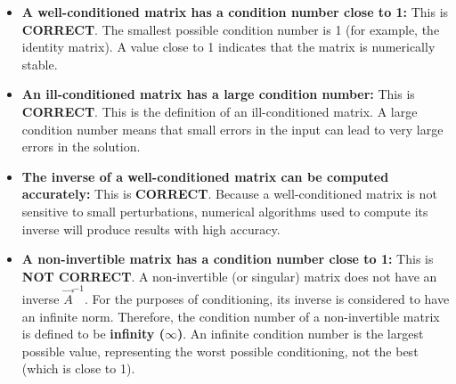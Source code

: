 \documentclass[journal]{IEEEtran}
\begin{document}
\begin{itemize}
    \item[\textbf{1)}] \textbf{A well-conditioned matrix has a condition number close to 1:} This is \textbf{CORRECT}. The smallest possible condition number is 1 (for example, the identity matrix). A value close to 1 indicates that the matrix is numerically stable.\\

    \item[\textbf{2)}] \textbf{An ill-conditioned matrix has a large condition number:} This is \textbf{CORRECT}. This is the definition of an ill-conditioned matrix. A large condition number means that small errors in the input can lead to very large errors in the solution.\\

    \item[\textbf{3)}] \textbf{The inverse of a well-conditioned matrix can be computed accurately:} This is \textbf{CORRECT}. Because a well-conditioned matrix is not sensitive to small perturbations, numerical algorithms used to compute its inverse will produce results with high accuracy.\\

    \item[\textbf{4)}] \textbf{A non-invertible matrix has a condition number close to 1:} This is \textbf{NOT CORRECT}. A non-invertible (or singular) matrix does not have an inverse $\vec{A}^{-1}$. For the purposes of conditioning, its inverse is considered to have an infinite norm. Therefore, the condition number of a non-invertible matrix is defined to be \textbf{infinity ($\infty$)}. An infinite condition number is the largest possible value, representing the worst possible conditioning, not the best (which is close to 1).
\end{itemize}
\end{document}
